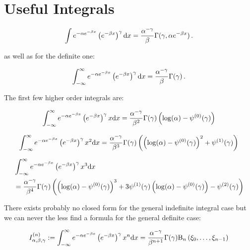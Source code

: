 \chapter{Useful Integrals}
\label{ch:integral}
\begin{equation}
  \label{int:indef_0}
  \int e^{-\alpha e^{-\beta x}} \left(e^{-\beta x}\right)^{\gamma} \mathrm{d}x
  =
  \frac{\alpha^{-\gamma}}{\beta}
  \Gamma(\gamma, \alpha e^{-\beta x}) \,.
\end{equation}

as well as for the definite one:

\begin{equation}
  \label{int:def_0}
  \int_{-\infty}^{\infty} e^{-\alpha e^{-\beta x}} \left(e^{-\beta x}\right)^{\gamma} \mathrm{d}x
  =
  \frac{\alpha^{-\gamma}}{\beta}
  \Gamma(\gamma) \,.
\end{equation}

The first few higher order integrals are:

\begin{equation}
  \label{int:def_1}
  \int_{-\infty}^{\infty} e^{-\alpha e^{-\beta x}} \left(e^{-\beta x}\right)^{\gamma} x \mathrm{d}x
  =
  \frac{\alpha^{-\gamma}}{\beta^{2}}
  \Gamma(\gamma)
  \left(\log(\alpha) - \psi^{(0)}(\gamma)\right)
\end{equation}

\begin{equation}
  \label{int:def_2}
  \int_{-\infty}^{\infty} e^{-\alpha e^{-\beta x}} \left(e^{-\beta x}\right)^{\gamma} x^{2} \mathrm{d}x
  =
  \frac{\alpha^{-\gamma}}{\beta^{3}}
  \Gamma(\gamma)
  \left(\left(\log(\alpha) - \psi^{(0)}(\gamma) \right)^{2} + \psi^{(1)}(\gamma) \right)
\end{equation}

\begin{align}
  \label{int:def_3}
  & \int_{-\infty}^{\infty} e^{-\alpha e^{-\beta x}} \left(e^{-\beta x}\right)^{\gamma} x^{3} \mathrm{d}x \\
  & =
  \frac{\alpha^{-\gamma}}{\beta^{4}}
  \Gamma(\gamma)
  \left(
    \left(\log(\alpha)-\psi^{(0)}(\gamma)\right)^3
    + 3 \psi ^{(1)}(\gamma) \left(\log(\alpha)-\psi ^{(0)}(\gamma)\right)
    - \psi^{(2)}(\gamma)
  \right)
\end{align}

There exists probably no closed form for the general indefinite integral case
but we can never the less find a formula for the general definite case:

\begin{equation}
  \label{int:def_n}
  I_{\alpha,\beta,\gamma}^{(n)} :=
  \int_{-\infty}^{\infty} e^{-\alpha e^{-\beta x}} \left(e^{-\beta x}\right)^{\gamma} x^{n} \mathrm{d}x \\
  =
  \frac{\alpha^{-\gamma}}{\beta^{n+1}}
  \Gamma(\gamma)
  \mathrm{B}_{n}\left(\xi_{0}, \ldots, \xi_{n-1}\right)
\end{equation}

